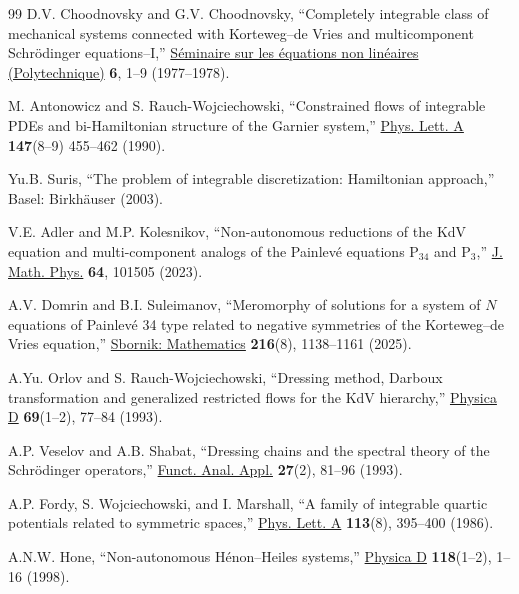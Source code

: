 \documentclass[11pt]{article}
\theoremstyle{plain}
\theoremstyle{definition}
\begin{document}
\begin{thebibliography}{99}
 D.V. Choodnovsky and G.V. Choodnovsky, ``Completely integrable class of mechanical systems connected with Korteweg--de Vries and multicomponent Schr\"odinger equations--I,'' \href{http://www.numdam.org/item/?id=SENL_1977-1978____A7_0}{S\'eminaire sur les \'equations non lin\'eaires (Polytechnique)} {\bf 6}, 1--9 (1977--1978).

 M. Antonowicz and S. Rauch-Wojciechowski, ``Constrained flows of integrable PDEs and bi-Hamiltonian structure of the Garnier system,'' \href{https://doi.org/10.1016/0375-9601(90)90606-O}{Phys. Lett. A} {\bf 147}(8--9) 455--462 (1990).

 Yu.B. Suris, ``The problem of integrable discretization: Hamiltonian approach,'' Basel: Birkh\"auser (2003). 

 V.E. Adler and M.P. Kolesnikov, ``Non-autonomous reductions of the KdV equation and multi-component analogs of the Painlev\'e equations P$_{34}$ and P$_3$,'' \href{https://doi.org/10.1063/5.0156409}{J. Math. Phys.} {\bf 64}, 101505 (2023). 

 A.V. Domrin and B.I. Suleimanov, ``Meromorphy of solutions for a system of $N$ equations of Painlev\'e 34 type related to negative symmetries of the Korteweg--de Vries equation,'' \href{https://doi.org/10.4213/sm10139e}{Sbornik: Mathematics} {\bf 216}(8), 1138--1161 (2025).

 A.Yu. Orlov and S. Rauch-Wojciechowski, ``Dressing method, Darboux transformation and generalized restricted flows for the KdV hierarchy,'' \href{https://doi.org/10.1016/0167-2789(93)90181-Y}{Physica D} {\bf 69}(1--2), 77--84 (1993).

 A.P. Veselov and A.B. Shabat, ``Dressing chains and the spectral theory of the Schr\"odinger operators,'' \href{https://doi.org/10.1007/BF01085979}{Funct. Anal. Appl.} {\bf 27}(2), 81--96 (1993).

 A.P. Fordy, S. Wojciechowski, and I. Marshall, ``A family of integrable quartic potentials related to symmetric spaces,'' \href{https://doi.org/10.1016/0375-9601(86)90658-4}{Phys. Lett. A} {\bf 113}(8), 395--400 (1986).

 A.N.W. Hone, ``Non-autonomous H\'enon--Heiles systems,'' \href{https://doi.org/10.1016/S0167-2789(98)00010-4}{Physica D} {\bf 118}(1--2), 1--16 (1998).


\end{thebibliography}
\end{document}
